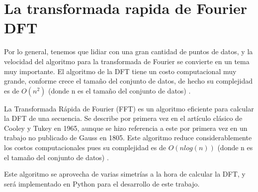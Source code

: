 \section{La transformada rapida de Fourier DFT}
\label{La transformada rapida de Fourier FFT}

Por lo general, tenemos que lidiar con una gran cantidad de puntos de datos, y la velocidad del algoritmo
para la transformada de Fourier se convierte en un tema muy importante. El algoritmo de la DFT tiene un costo
computacional muy grande, conforme crece el tamaño del conjunto de datos, de hecho su complejidad es de
$O(n^{2})$ (donde n es el tamaño del conjunto de datos) .


La Transformada Rápida de Fourier (FFT) es un algoritmo eficiente para calcular la DFT de una secuencia.
Se describe por primera vez en el artículo clásico de Cooley y Tukey en 1965, aunque se hizo referencia
a este por primera vez en un trabajo no publicado de Gauss en 1805. Este algoritmo reduce considerablemente
los costos computacionales pues su complejidad es de $O(nlog(n))$ (donde n es el tamaño del conjunto de datos) .


Este algoritmo se aprovecha de varias simetrías a la hora de calcular la DFT, y será implementado en Python para
el desarrollo de este trabajo.